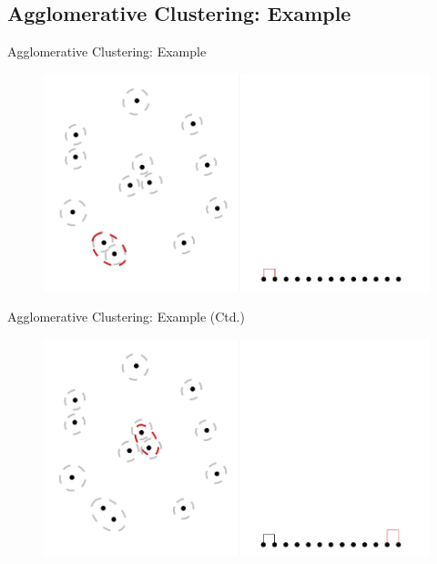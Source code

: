 \subsection{Agglomerative Clustering: Example}

\begin{frame}{Agglomerative Clustering: Example}{}
	\begin{figure}
		\centering
		\includegraphics[scale=0.4]{12_clustering/02_img/aggl_clust_1}
	\end{figure}
\end{frame}


\begin{frame}{Agglomerative Clustering: Example (Ctd.)}{}
	\begin{figure}
		\centering
		\includegraphics[scale=0.4]{12_clustering/02_img/aggl_clust_2}
	\end{figure}
\end{frame}


